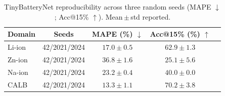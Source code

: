 \begin{table}[t]
\centering
\caption{TinyBatteryNet reproducibility across three random seeds (MAPE $\downarrow$; Acc@15\% $\uparrow$). Mean\,$\pm$\,std reported.}
\label{tab:multiseed}
\begin{tabular*}{\tblwidth}{@{}LCCCC@{}}
\toprule
Domain & Seeds & MAPE (\%) $\downarrow$ & Acc@15\% (\%) $\uparrow$ \\
\midrule
Li-ion & 42/2021/2024 & $17.0 \pm 0.5$ & $62.9 \pm 1.3$ \\
Zn-ion & 42/2021/2024 & $36.8 \pm 1.6$ & $25.1 \pm 5.6$ \\
Na-ion & 42/2021/2024 & $23.2 \pm 0.4$ & $40.0 \pm 0.0$ \\
CALB & 42/2021/2024 & $13.3 \pm 1.1$ & $70.2 \pm 3.8$ \\
\bottomrule
\end{tabular*}
\end{table}
